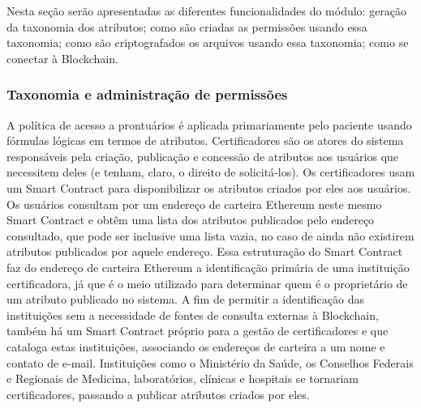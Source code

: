 \documentclass[a4paper,11pt]{article}
\begin{document}
Nesta seção serão apresentadas as diferentes funcionalidades do módulo: geração da taxonomia dos atributos; como são criadas as permissões usando essa taxonomia; como são criptografados os arquivos usando essa taxonomia; como se conectar à Blockchain.

\subsubsection{Taxonomia e administração de permissões}
\label{sec:sub:taxonomia-permissoes}

A política de acesso a prontuários é aplicada primariamente pelo paciente usando fórmulas lógicas em termos de atributos.
Certificadores são os atores do sistema responsáveis pela criação, publicação e concessão de atributos aos usuários que necessitem deles (e tenham, claro, o direito de solicitá-los).
Os certificadores usam um Smart Contract para disponibilizar os atributos criados por eles aos usuários.
Os usuários consultam por um endereço de carteira Ethereum neste mesmo Smart Contract e obtêm uma lista dos atributos publicados pelo endereço consultado, que pode ser inclusive uma lista vazia, no caso de ainda não existirem atributos publicados por aquele endereço.
Essa estruturação do Smart Contract faz do endereço de carteira Ethereum a identificação primária de uma instituição certificadora, já que é o meio utilizado para determinar quem é o proprietário de um atributo publicado no sistema.
A fim de permitir a identificação das instituições sem a necessidade de fontes de consulta externas à Blockchain, também há um Smart Contract próprio para a gestão de certificadores e que cataloga estas instituições, associando os endereços de carteira a um nome e contato de e-mail. %
Instituições como o Ministério da Saúde, os Conselhos Federais e Regionais de Medicina, laboratórios, clínicas e hospitais se tornariam certificadores, passando a publicar atributos criados por eles.
\end{document}
